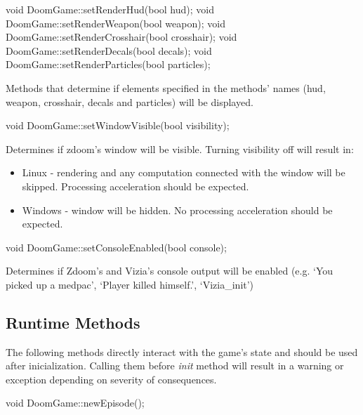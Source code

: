\vspace{20pt}
\begin{clinee}       
void DoomGame::setRenderHud(bool hud);
void DoomGame::setRenderWeapon(bool weapon);
void DoomGame::setRenderCrosshair(bool crosshair);
void DoomGame::setRenderDecals(bool decals);
void DoomGame::setRenderParticles(bool particles);
\end{clinee}

	Methods that determine if elements specified in the methods' names (hud, weapon, crosshair, decals and particles) will be displayed.


\vspace{20pt}
\begin{clinee}
void DoomGame::setWindowVisible(bool visibility);
\end{clinee}

	Determines if zdoom's window will be visible. Turning visibility off will result in:
	\begin{itemize}
		\item Linux - rendering and any computation connected with the window will be skipped. Processing acceleration should be expected.
		\item Windows - window will be hidden. No processing acceleration should be expected.
	\end{itemize}


\vspace{20pt}
\begin{clinee}
void DoomGame::setConsoleEnabled(bool console);
\end{clinee}

	Determines if Zdoom's and Vizia's console output will be enabled (e.g. `You picked up a medpac', `Player killed himself.', `Vizia\_init')


\vspace{20pt}
\subsection{Runtime Methods}\label{subsec:runtime_methods}
	The following methods directly interact with the game's state and should be used after inicialization. Calling them before \emph{init} method will result in a warning or exception depending on severity of consequences. 

\vspace{20pt}
\begin{clinee}
void DoomGame::newEpisode();
\end{clinee}

